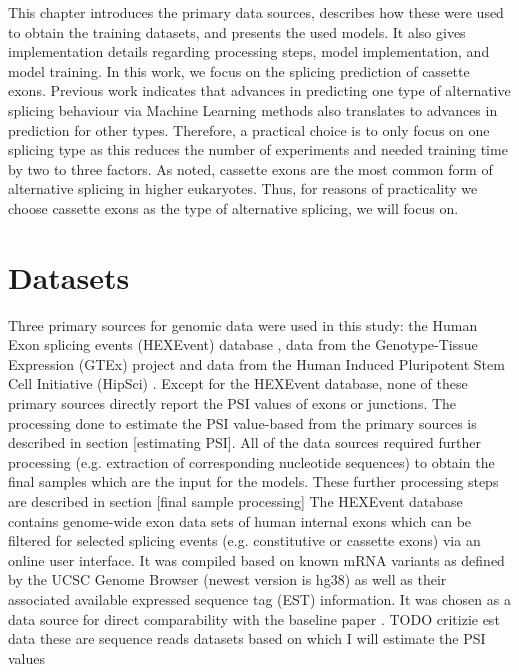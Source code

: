 
This chapter introduces the primary data sources, describes how these were used to obtain the training datasets, and presents the used models. It also gives implementation details regarding processing steps, model implementation, and model training.
In this work, we focus on the splicing prediction of cassette exons. Previous work indicates that advances in predicting one type of alternative splicing behaviour via Machine Learning methods also translates to advances in prediction for other types. Therefore, a practical choice is to only focus on one splicing type as this reduces the number of experiments and needed training time by two to three factors. As noted, cassette exons are the most common form of alternative splicing in higher eukaryotes. Thus, for reasons of practicality we choose cassette exons as the type of alternative splicing, we will focus on.
\section{Datasets}\label{sec:datasets}
Three primary sources for genomic data were used in this study: the Human Exon splicing events (HEXEvent) database \cite{hexevent}, data from the Genotype-Tissue Expression (GTEx) project \cite{gtex} and data from the Human Induced Pluripotent Stem Cell Initiative (HipSci) \cite{hipsci}. Except for the HEXEvent database, none of these primary sources directly report the PSI values of exons or junctions. The processing done to estimate the PSI value-based from the primary sources is described in section [estimating PSI]. All of the data sources required further processing (e.g. extraction of corresponding nucleotide sequences) to obtain the final samples which are the input for the models. These further processing steps are described in section [final sample processing]
The HEXEvent database contains genome-wide exon data sets of human internal exons which can be filtered for selected splicing events (e.g. constitutive or cassette exons) via an online user interface. It was compiled based on known mRNA variants as defined by the UCSC Genome Browser (newest version is hg38) as well as their associated available expressed sequence tag (EST) information.
It was chosen as a data source for direct comparability with the baseline paper \cite{dsc}.
TODO critizie est data
these are sequence reads datasets based on which I will estimate the PSI values
